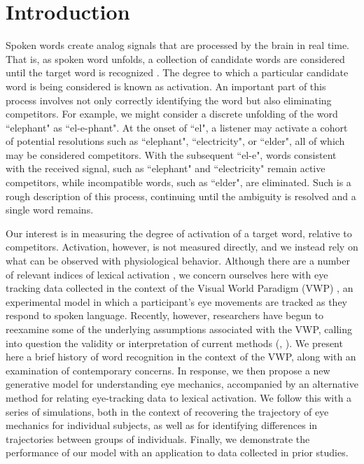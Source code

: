 \section{Introduction}


Spoken words create analog signals that are processed by the brain in real time. That is, as spoken word unfolds, a collection of candidate words are considered until the target word is recognized \citep{MarslenWilson1987}. The degree to which a particular candidate word is being considered is known as activation. An important part of this process involves not only correctly identifying the word but also eliminating competitors. For example, we might consider a discrete unfolding of the word ``elephant" as ``el-e-phant". At the onset of ``el", a listener may activate a cohort of potential resolutions such as ``elephant", ``electricity", or ``elder", all of which may be considered competitors. With the subsequent ``el-e", words consistent with the received signal, such as ``elephant" and ``electricity" remain active competitors, while incompatible words, such as ``elder", are eliminated. Such is a rough description of this process, continuing until the ambiguity is resolved and a single word remains.


Our interest is in measuring the degree of activation of a target word, relative to competitors. Activation, however, is not measured directly, and we instead rely on what can be observed with physiological behavior. Although there are a number of relevant indices of lexical activation \citep{Spivey2005}, we concern ourselves here with eye tracking data collected in the context of the Visual World Paradigm (VWP) \citep{tanenhaus1995integration}, an experimental model in which a participant's eye movements are tracked as they respond to spoken language. Recently, however, researchers have begun to reexamine some of the underlying assumptions associated with the VWP, calling into question the validity or interpretation of current methods (\citep{Magnuson2019}, \citep{mcmurray2022m}). We present here a brief history of word recognition in the context of the VWP, along with an examination of contemporary concerns. In response, we then propose a new generative model for understanding eye mechanics, accompanied by an alternative method for relating eye-tracking data to lexical activation. We follow this with a series of simulations, both in the context of recovering the trajectory of eye mechanics for individual subjects, as well as for identifying differences in trajectories between groups of individuals. Finally, we demonstrate the performance of our model with an application to data collected in prior studies. 


